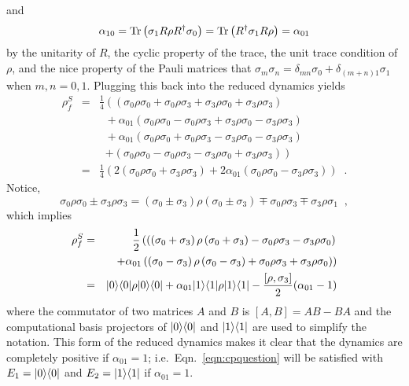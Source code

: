 and
$$
\alpha_{10} = \operatorname{Tr}\left( \sigma_1 R \rho R^\dagger \sigma_0 \right) = \operatorname{Tr}\left( R^\dagger \sigma_1 R \rho \right) = \alpha_{01}
$$
by the unitarity of $R$, the cyclic property of the trace, the unit trace condition of $\rho$, and the nice property of the Pauli matrices that $\sigma_m\sigma_n = \delta_{mn} \sigma_0 + \delta_{(m+n)1}\sigma_1$ when $m,n=0,1$.  Plugging this back into the reduced dynamics yields
\begin{eqnarray*}
\rho^S_f &=& \frac{1}{4}\left( \left(\sigma_0\rho\sigma_0 + \sigma_0\rho\sigma_3 + \sigma_3\rho\sigma_0 + \sigma_3\rho\sigma_3\right)\right.\\
& &\;\;+ \alpha_{01} \left( \sigma_0\rho\sigma_0 - \sigma_0\rho\sigma_3 + \sigma_3\rho\sigma_0 - \sigma_3\rho\sigma_3\right)\\
& &\;\; + \alpha_{01}\left( \sigma_0\rho\sigma_0 +\sigma_0\rho\sigma_3 - \sigma_3\rho\sigma_0 - \sigma_3\rho\sigma_3 \right) \\
& &\;\;\left.+ \left( \sigma_0\rho\sigma_0 - \sigma_0\rho\sigma_3 - \sigma_3\rho\sigma_0 +\sigma_3\rho\sigma_3 \right) \right)\\
&=& \frac{1}{4}\left( 2 \left(\sigma_0\rho\sigma_0 + \sigma_3\rho\sigma_3\right)+ 2\alpha_{01} \left( \sigma_0\rho\sigma_0 - \sigma_3\rho\sigma_3\right)\right)\;\;.
\end{eqnarray*}
Notice,
$$
\sigma_0\rho\sigma_0 \pm \sigma_3\rho\sigma_3 = \left(\sigma_0\pm\sigma_3\right)\rho\left(\sigma_0\pm\sigma_3\right) \mp \sigma_0\rho\sigma_3 \mp \sigma_3\rho\sigma_1\;\;,
$$
which implies
\begin{eqnarray*}
\rho^S_f &=& \frac{1}{2}\left( \left(\left(\sigma_0+\sigma_3\right)\rho\left(\sigma_0+\sigma_3\right) - \sigma_0\rho\sigma_3 - \sigma_3\rho\sigma_0\right)\right.\\
& &\;\;\left. + \alpha_{01} \left( \left(\sigma_0-\sigma_3\right)\rho\left(\sigma_0-\sigma_3\right) + \sigma_0\rho\sigma_3 + \sigma_3\rho\sigma_0\right)\right)\\
&=& |0\rangle\langle0|\rho|0\rangle\langle0| + \alpha_{01} |1\rangle\langle1|\rho|1\rangle\langle1| - \frac{[\rho,\sigma_3]}{2}(\alpha_{01}-1)
\end{eqnarray*}
where the commutator of two matrices $A$ and $B$ is $[A,B] = AB-BA$ and the computational basis projectors of $|0\rangle\langle0|$ and $|1\rangle\langle1|$ are used to simplify the notation.  This form of the reduced dynamics makes it clear that the dynamics are completely positive if $\alpha_{01}=1$; i.e.\ Eqn.\ \ref{eqn:cpquestion} will be satisfied with $E_1 = |0\rangle\langle0|$ and $E_2 = |1\rangle\langle1|$ if $\alpha_{01}=1$.  

